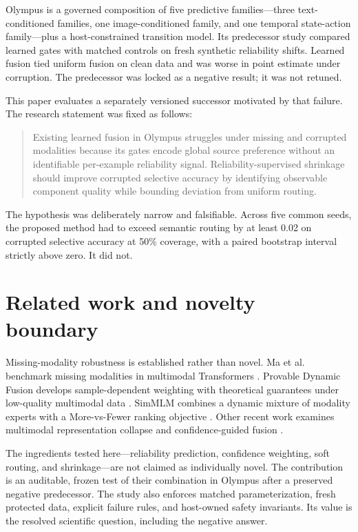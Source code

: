 \documentclass[10pt]{article}
\begin{document}
Olympus is a governed composition of five predictive families---three text-conditioned
families, one image-conditioned family, and one temporal state-action family---plus a
host-constrained transition model. Its predecessor study compared learned gates with
matched controls on fresh synthetic reliability shifts. Learned fusion tied uniform fusion
on clean data and was worse in point estimate under corruption. The predecessor was locked
as a negative result; it was not retuned.

This paper evaluates a separately versioned successor motivated by that failure. The
research statement was fixed as follows:

\begin{quote}
Existing learned fusion in Olympus struggles under missing and corrupted modalities because
its gates encode global source preference without an identifiable per-example reliability
signal. Reliability-supervised shrinkage should improve corrupted selective accuracy by
identifying observable component quality while bounding deviation from uniform routing.
\end{quote}

The hypothesis was deliberately narrow and falsifiable. Across five common seeds, the
proposed method had to exceed semantic routing by at least 0.02 on corrupted selective
accuracy at 50\% coverage, with a paired bootstrap interval strictly above zero. It did not.

\section{Related work and novelty boundary}
Missing-modality robustness is established rather than novel. Ma et al. benchmark missing
modalities in multimodal Transformers \cite{ma2022missing}. Provable Dynamic Fusion develops
sample-dependent weighting with theoretical guarantees under low-quality multimodal data
\cite{zhang2023dynamic}. SimMLM combines a dynamic mixture of modality experts with a
More-vs-Fewer ranking objective \cite{li2025simmlm}. Other recent work examines multimodal
representation collapse \cite{chaudhuri2025collapse} and confidence-guided fusion
\cite{jorf2025medpatch}.

The ingredients tested here---reliability prediction, confidence weighting, soft routing,
and shrinkage---are not claimed as individually novel. The contribution is an auditable,
frozen test of their combination in Olympus after a preserved negative predecessor. The
study also enforces matched parameterization, fresh protected data, explicit failure rules,
and host-owned safety invariants. Its value is the resolved scientific question, including
the negative answer.
\end{document}
